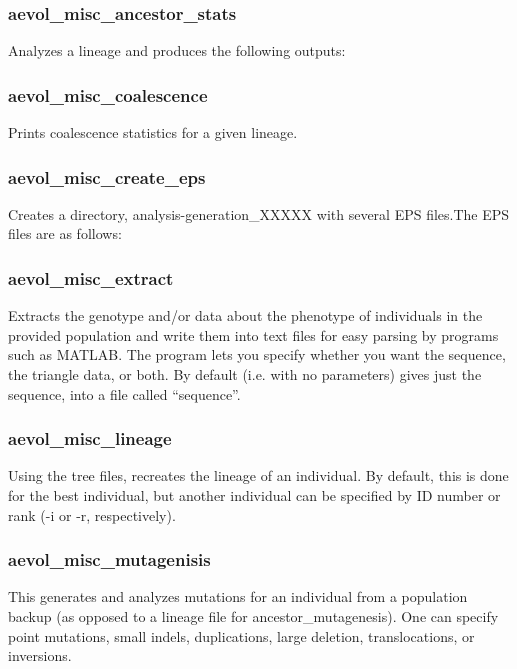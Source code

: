 \subsubsection{aevol\_misc\_ancestor\_stats}

Analyzes a lineage and produces the following outputs:



\subsubsection{aevol\_misc\_coalescence}
Prints coalescence statistics for a given lineage.

\subsubsection{aevol\_misc\_create\_eps}
Creates a directory, analysis-generation\_XXXXX with several EPS files.The EPS files are as follows:


\subsubsection{aevol\_misc\_extract}

Extracts the genotype and/or data about the phenotype of individuals in the provided population and write them into text files for easy parsing by programs such as MATLAB. The program lets you specify whether you want the sequence, the triangle data, or both. By default (i.e. with no parameters) gives just the sequence, into a file called “sequence”.

\subsubsection{aevol\_misc\_lineage}

Using the tree files, recreates the lineage of an individual. By default, this is done for the best individual, but another individual can be specified by ID number or rank (-i or -r, respectively). 

\subsubsection{aevol\_misc\_mutagenisis}

This generates and analyzes mutations for an individual from a population backup (as opposed to a lineage file for ancestor\_mutagenesis). One can specify point mutations, small indels, duplications, large deletion, translocations, or inversions. 

